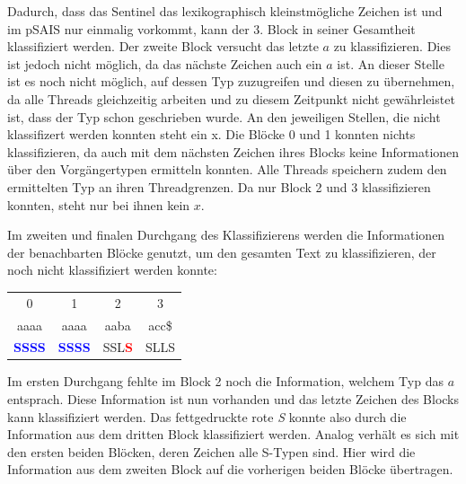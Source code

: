 Dadurch, dass das Sentinel das lexikographisch kleinstmögliche Zeichen ist und im pSAIS nur einmalig vorkommt, kann der 3. Block in seiner Gesamtheit klassifiziert werden. Der zweite Block versucht das letzte $a$ zu klassifizieren. Dies ist jedoch nicht möglich, da das nächste Zeichen auch ein $a$ ist. An dieser Stelle ist es noch nicht möglich, auf dessen Typ zuzugreifen und diesen zu übernehmen, da alle Threads gleichzeitig arbeiten und zu diesem Zeitpunkt nicht gewährleistet ist, dass der Typ schon geschrieben wurde. An den jeweiligen Stellen, die nicht klassifizert werden konnten steht ein x. Die Blöcke 0 und 1 konnten nichts klassifizieren, da auch mit dem nächsten Zeichen ihres Blocks keine Informationen über den Vorgängertypen ermitteln konnten. Alle Threads speichern zudem den ermittelten Typ an ihren Threadgrenzen. Da nur Block 2 und 3 klassifizieren konnten, steht nur bei ihnen kein $x$.

Im zweiten und finalen Durchgang des Klassifizierens werden die Informationen der benachbarten Blöcke genutzt, um den gesamten Text zu klassifizieren, der noch nicht klassifiziert werden konnte:

\begin{center}
	\begin{tabular}{c|c|c|c}      
		           0     	&             1         &           2           &             3    \\ 
          	aaaa     		&          aaaa         &        aaba           &          acc\$    \\            
\textbf{\textcolor{blue}{S}}\textbf{\textcolor{blue}{S}}\textbf{\textcolor{blue}{S}}\textbf{\textcolor{blue}{S}} &  \textbf{\textcolor{blue}{S}}\textbf{\textcolor{blue}{S}}\textbf{\textcolor{blue}{S}}\textbf{\textcolor{blue}{S}} & SSL\textbf{\textcolor{red}{S}}  & SLLS     \\             	       
	\end{tabular}
\end{center}

Im ersten Durchgang fehlte im Block 2 noch die Information, welchem Typ das $a$ entsprach. Diese Information ist nun vorhanden und das letzte Zeichen des Blocks kann klassifiziert werden. Das fettgedruckte rote \textit{S} konnte also durch die Information aus dem dritten Block klassifiziert werden. Analog verhält es sich mit den ersten beiden Blöcken, deren Zeichen alle S-Typen sind. Hier wird die Information aus dem zweiten Block auf die vorherigen beiden Blöcke übertragen.


